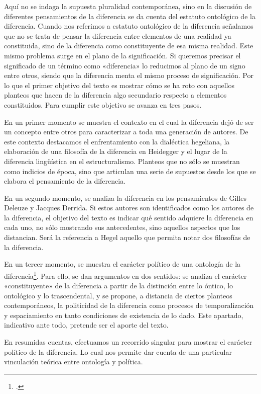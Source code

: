 Aquí no se indaga la supuesta pluralidad contemporánea, sino en la discusión de diferentes pensamientos de la diferencia se da cuenta del estatuto ontológico de la diferencia. Cuando nos referimos a estatuto ontológico de la diferencia señalamos que no se trata de pensar la diferencia entre elementos de una realidad ya constituida, sino de la diferencia como constituyente de esa misma realidad. Este mismo problema surge en el plano de la significación. Si queremos precisar el significado de un término como «diferencia» lo reducimos al plano de un signo entre otros, siendo que la diferencia menta el mismo proceso de significación. Por lo que el primer objetivo del texto es mostrar cómo se ha roto con aquellos planteos que hacen de la diferencia algo secundario respecto a elementos constituidos. Para cumplir este objetivo se avanza en tres pasos.

En un primer momento se muestra el contexto en el cual la diferencia dejó de ser un concepto entre otros para caracterizar a toda una generación de autores. De este contexto destacamos el enfrentamiento con la dialéctica hegeliana, la elaboración de una filosofía de la diferencia en Heidegger y el lugar de la diferencia lingüística en el estructuralismo. Planteos que no sólo se muestran como indicios de época, sino que articulan una serie de supuestos desde los que se elabora el pensamiento de la diferencia.

En un segundo momento, se analiza la diferencia en los pensamientos de Gilles Deleuze y Jacques Derrida. Si estos autores son identificados como los autores de la diferencia, el objetivo del texto es indicar qué sentido adquiere la diferencia en cada uno, no sólo mostrando sus antecedentes, sino aquellos aspectos que los distancian. Será la referencia a Hegel aquello que permita notar dos filosofías de la diferencia.

En un tercer momento, se muestra el carácter político de una ontología de la diferencia\footcite{@6960-BEISTEGUI2004}. Para ello, se dan argumentos en dos sentidos: se analiza el carácter «constituyente» de la diferencia a partir de la distinción entre lo óntico, lo ontológico y lo trascendental, y se propone, a distancia de ciertos planteos contemporáneos, la politicidad de la diferencia como procesos de temporalización y espaciamiento en tanto condiciones de existencia de lo dado. Este apartado, indicativo ante todo, pretende ser el aporte del texto.

En resumidas cuentas, efectuamos un recorrido singular para mostrar el carácter político de la diferencia. Lo cual nos permite dar cuenta de una particular vinculación teórica entre ontología y política.

